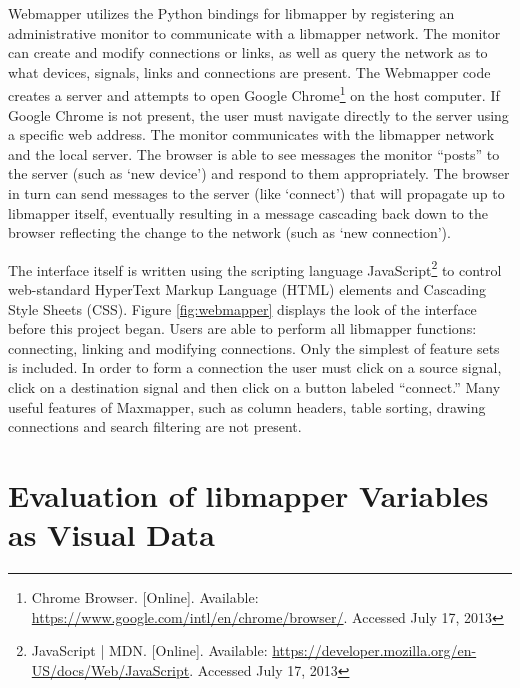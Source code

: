 Webmapper utilizes the Python bindings for libmapper by registering an administrative monitor to communicate with a libmapper network. The monitor can create and modify connections or links, as well as query the network as to what devices, signals, links and connections are present. The Webmapper code creates a server and attempts to open Google Chrome\footnote{Chrome Browser. [Online]. Available: \url{https://www.google.com/intl/en/chrome/browser/}. Accessed July 17, 2013} on the host computer. If Google Chrome is not present, the user must navigate directly to the server using a specific web address. The monitor communicates with the libmapper network and the local server. The browser is able to see messages the monitor ``posts'' to the server (such as `new device') and respond to them appropriately. The browser in turn can send messages to the server (like `connect') that will propagate up to libmapper itself, eventually resulting in a message cascading back down to the browser reflecting the change to the network (such as `new connection'). 

The interface itself is written using the scripting language JavaScript\footnote{JavaScript | MDN. [Online]. Available: \url{https://developer.mozilla.org/en-US/docs/Web/JavaScript}. Accessed July 17, 2013} to control web-standard HyperText Markup Language (HTML) elements and Cascading Style Sheets (CSS). Figure \ref{fig:webmapper} displays the look of the interface before this project began. Users are able to perform all libmapper functions: connecting, linking and modifying connections. Only the simplest of feature sets is included. In order to form a connection the user must click on a source signal, click on a destination signal and then click on a button labeled ``connect.'' Many useful features of Maxmapper, such as column headers, table sorting, drawing connections and search filtering are not present.



\section{Evaluation of libmapper Variables as Visual Data} %
\label{sec:evaluation_of_libmapper_variables}

